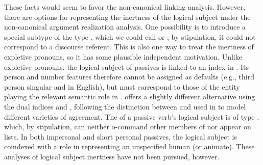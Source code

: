 \documentclass[output=paper
	        ,collection
	        ,collectionchapter
 	        ,biblatex
                ,babelshorthands
                ,newtxmath
                ,draftmode
                ,colorlinks, citecolor=brown
]{langscibook}
\begin{document}
These facts would seem to favor the non-canonical linking analysis.
However, there are options for representing the inertness of the logical subject under the non-canonical argument realization analysis.
One possibility is to introduce a special subtype of the type , which we could call  or ; by stipulation, it could not correspond to a discourse referent.
This is also one way to treat the inertness of expletive pronouns, so it has some plausible independent motivation.
Unlike expletive pronouns, the logical subject of passives is linked to an index in .
Its person and number features therefore cannot be assigned as defaults (e.g., third person singular  and  in English), but must correspond to those of the entity playing the relevant semantic role in .
\citet[251--253]{Davis2001} offers a slightly different alternative using the dual indices  and , following the distinction between  and  used in \citet[240--250]{Kathol1999b} to model different varieties of agreement.
The  of a passive verb's logical subject is of type , which, by stipulation, can neither o-command other members of \argst nor appear on \val lists.
In both impersonal and short personal passives, the logical subject is coindexed with a role in  representing an unspecified human (or animate).
These analyses of logical subject inertness have not been pursued, however.

\end{document}

